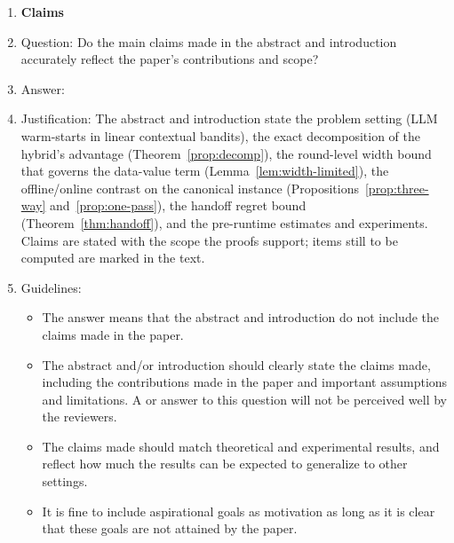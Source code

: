 \documentclass{article}
\theoremstyle{definition}
\theoremstyle{remark}
\theoremstyle{remark}
\begin{document}


\begin{enumerate}

\item {\bf Claims}
    \item[] Question: Do the main claims made in the abstract and introduction accurately reflect the paper's contributions and scope?
    \item[] Answer: \answerYes{} %
    \item[] Justification: The abstract and introduction state the problem setting (LLM warm-starts in linear contextual bandits), the exact decomposition of the hybrid's advantage (Theorem~\ref{prop:decomp}), the round-level width bound that governs the data-value term (Lemma~\ref{lem:width-limited}), the offline/online contrast on the canonical instance (Propositions~\ref{prop:three-way} and~\ref{prop:one-pass}), the handoff regret bound (Theorem~\ref{thm:handoff}), and the pre-runtime estimates and experiments. Claims are stated with the scope the proofs support; items still to be computed are marked in the text.
    \item[] Guidelines:
    \begin{itemize}
        \item The answer \answerNA{} means that the abstract and introduction do not include the claims made in the paper.
        \item The abstract and/or introduction should clearly state the claims made, including the contributions made in the paper and important assumptions and limitations. A \answerNo{} or \answerNA{} answer to this question will not be perceived well by the reviewers. 
        \item The claims made should match theoretical and experimental results, and reflect how much the results can be expected to generalize to other settings. 
        \item It is fine to include aspirational goals as motivation as long as it is clear that these goals are not attained by the paper. 
    \end{itemize}


\end{enumerate}
\end{document}
